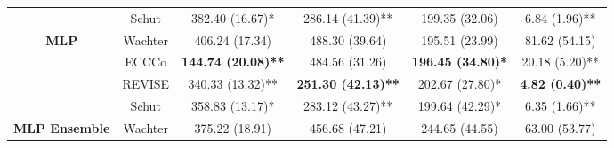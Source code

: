 \begin{table}
{\begin{tabular}[t]{>{}cccccc}
 & Schut & 382.40 (16.67)* & 286.14 (41.39)** & 199.35 (32.06) & 6.84 (1.96)**\\

\multirow{-4}{*}{\centering\arraybackslash \textbf{MLP}} & Wachter & 406.24 (17.34) & 488.30 (39.64) & 195.51 (23.99) & 81.62 (54.15)\\
\cmidrule{1-6}
 & ECCCo & \textbf{144.74 (20.08)**} & 484.56 (31.26) & \textbf{196.45 (34.80)*} & 20.18 (5.20)**\\

 & REVISE & 340.33 (13.32)** & \textbf{251.30 (42.13)**} & 202.67 (27.80)* & \textbf{4.82 (0.40)**}\\

 & Schut & 358.83 (13.17)* & 283.12 (43.27)** & 199.64 (42.29)* & 6.35 (1.66)**\\

\multirow{-4}{*}{\centering\arraybackslash \textbf{MLP Ensemble}} & Wachter & 375.22 (18.91) & 456.68 (47.21) & 244.65 (44.55) & 63.00 (53.77)\\
\bottomrule
\end{tabular}}
\end{table}

